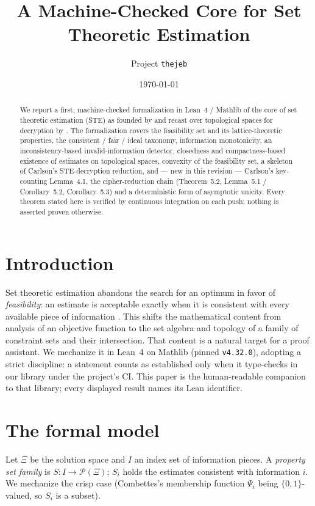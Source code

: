 \documentclass[11pt]{article}
\title{A Machine-Checked Core for Set Theoretic Estimation}
\author{Project \texttt{thejeb}}
\date{\today}
\begin{document}
\maketitle

\begin{abstract}
We report a first, machine-checked formalization in Lean~4 / Mathlib of
the core of set theoretic estimation (STE) as founded by
\citet{combettes1993} and recast over topological spaces for decryption
by \citet{carlson2012}. The formalization covers the feasibility set and
its lattice-theoretic properties, the consistent / fair / ideal
taxonomy, information monotonicity, an inconsistency-based
invalid-information detector, closedness and compactness-based existence
of estimates on topological spaces, convexity of the feasibility set,
a skeleton of Carlson's STE-decryption reduction, and --- new in this
revision --- Carlson's key-counting Lemma~4.1, the cipher-reduction
chain (Theorem~5.2, Lemma~5.1 / Corollary~5.2, Corollary~5.3) and a
deterministic form of asymptotic unicity. Every theorem
stated here is verified by continuous integration on each push; nothing
is asserted proven otherwise.
\end{abstract}

\section{Introduction}
Set theoretic estimation abandons the search for an optimum in favor of
\emph{feasibility}: an estimate is acceptable exactly when it is
consistent with every available piece of information
\citep{combettes1993}. This shifts the mathematical content from analysis
of an objective function to the set algebra and topology of a family of
constraint sets and their intersection. That content is a natural target
for a proof assistant. We mechanize it in Lean~4 on Mathlib (pinned
\texttt{v4.32.0}), adopting a strict discipline: a statement counts as
established only when it type-checks in our library under the project's
CI. This paper is the human-readable companion to that library; every
displayed result names its Lean identifier.

\section{The formal model}
Let $\Xi$ be the solution space and $I$ an index set of information
pieces. A \emph{property set family} is $S:I\to\mathcal P(\Xi)$; $S_i$
holds the estimates consistent with information $i$. We mechanize the
crisp case (Combettes's membership function $\Psi_i$ being
$\{0,1\}$-valued, so $S_i$ is a subset).
\end{document}
